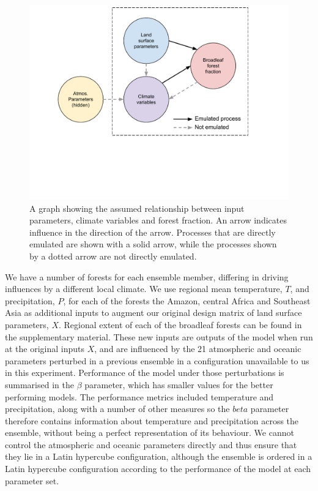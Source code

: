 \documentclass[gmd, manuscript]{copernicus}
\begin{document}
\begin{figure}[t]
\includegraphics[width=12cm]{../graphics/dag.pdf}
\caption{A graph showing the assumed relationship between input parameters, climate variables and forest fraction. An arrow indicates influence in the direction of the arrow. Processes that are directly emulated are shown with a solid arrow, while the processes shown by a dotted arrow are not directly emulated. 
}
\label{fig:dag}
\end{figure}

We have a number of forests for each ensemble member, differing in driving influences by a different local climate. We use regional mean temperature, $T$, and precipitation, $P$, for each of the forests the Amazon, central Africa and Southeast Asia as additional inputs to augment our original design matrix of land surface parameters, $X$. Regional extent of each of the broadleaf forests can be found in the supplementary material. These new inputs are outputs of the model when run at the original inputs $X$, and are influenced by the 21 atmospheric and oceanic parameters perturbed in a previous ensemble in a configuration unavailable to us in this experiment. Performance of the model under those perturbations is summarised in the $\beta$ parameter, which has smaller values for the better performing models. The performance metrics included temperature and precipitation, along with a number of other measures so the $beta$ parameter therefore contains information about temperature and precipitation across the ensemble, without being a perfect representation of its behaviour. We cannot control the atmospheric and oceanic parameters directly and thus ensure that they lie in a Latin hypercube configuration, although the ensemble is ordered in a Latin hypercube configuration according to the performance of the model at each parameter set. 
\end{document}
